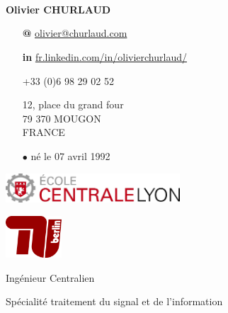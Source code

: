 \documentclass[skip,a4paper]{article}
\begin{document}
\fontsize{8.5}{9.5}
\selectfont

\begin{minipage}[c]{\linewidth}
	\begin{minipage}[c][4cm]{2.6cm}
		~\\~\\
		\vfill
		~
	\end{minipage}
	\begin{minipage}[c][4cm]{5.5cm}
		\textbf{Olivier CHURLAUD}

		\begin{itemize}[itemsep=0.5ex,leftmargin=3ex]
			\footnotesize
			\item[\bfseries @] \url{olivier@churlaud.com}
			\item[\bfseries \color{blue} in] {\scriptsize\url{ fr.linkedin.com/in/olivierchurlaud/}}
			\item[\Telefon] +33 (0)6 98 29 02 52
			\item[\Letter] 12, place du grand four \\
			79 370 MOUGON \\ 
			FRANCE
			\item[$\bullet$] né le 07 avril 1992
		\end{itemize}
	\end{minipage}
	\begin{minipage}[c][4cm]{10cm}
		\begin{minipage}[c]{7.10cm}
			\includegraphics[width=6.5cm]{img/ecl}
		\end{minipage}
		\hfill
		\begin{minipage}[c]{2.5cm}
			\includegraphics[width=2.1cm]{img/tuberlin}
		\end{minipage}
		
		\vfill
		
		\centering
		{
			\setlength{\parskip}{10pt plus 1pt minus 1pt}
			{\LARGE Ingénieur Centralien}
			
			{\Large Spécialité traitement du signal et de l'information}
		}
	\end{minipage}
\end{minipage}
\end{document}
